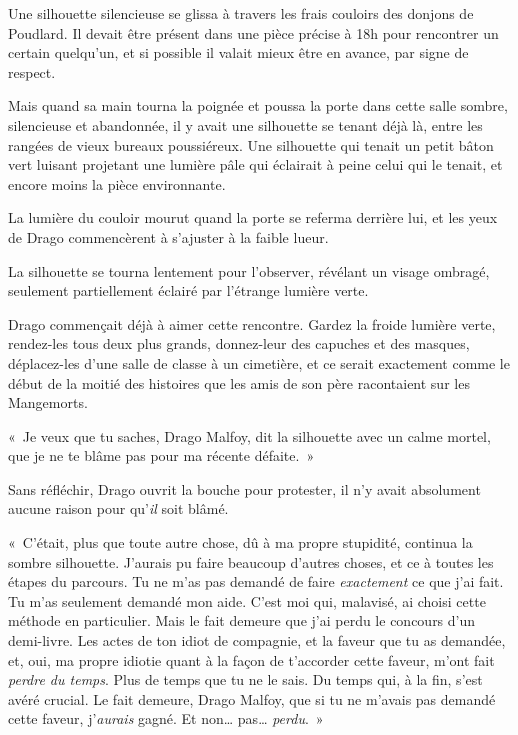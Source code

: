 \later

Une silhouette silencieuse se glissa à travers les frais couloirs des donjons de Poudlard.
Il devait être présent dans une pièce précise à 18h pour rencontrer un certain quelqu'un, et si possible il valait mieux être en avance, par signe de respect.

Mais quand sa main tourna la poignée et poussa la porte dans cette salle sombre, silencieuse et abandonnée, il y avait une silhouette se tenant déjà là, entre les rangées de vieux bureaux poussiéreux.
Une silhouette qui tenait un petit bâton vert luisant projetant une lumière pâle qui éclairait à peine celui qui le tenait, et encore moins la pièce environnante.

La lumière du couloir mourut quand la porte se referma derrière lui, et les yeux de Drago commencèrent à s'ajuster à la faible lueur.

La silhouette se tourna lentement pour l'observer, révélant un visage ombragé, seulement partiellement éclairé par l'étrange lumière verte.

Drago commençait déjà à aimer cette rencontre.
Gardez la froide lumière verte, rendez-les tous deux plus grands, donnez-leur des capuches et des masques, déplacez-les d'une salle de classe à un cimetière, et ce serait exactement comme le début de la moitié des histoires que les amis de son père racontaient sur les Mangemorts.

«~Je veux que tu saches, Drago Malfoy, dit la silhouette avec un calme mortel, que je ne te blâme pas pour ma récente défaite.~»

Sans réfléchir, Drago ouvrit la bouche pour protester, il n'y avait absolument aucune raison pour qu'\emph{il} soit blâmé.

«~C'était, plus que toute autre chose, dû à ma propre stupidité, continua la sombre silhouette.
J'aurais pu faire beaucoup d'autres choses, et ce à toutes les étapes du parcours.
Tu ne m'as pas demandé de faire \emph{exactement} ce que j'ai fait.
Tu m'as seulement demandé mon aide.
C'est moi qui, malavisé, ai choisi cette méthode en particulier.
Mais le fait demeure que j'ai perdu le concours d'un demi-livre.
Les actes de ton idiot de compagnie, et la faveur que tu as demandée, et, oui, ma propre idiotie quant à la façon de t'accorder cette faveur, m'ont fait \emph{perdre du temps}.
Plus de temps que tu ne le sais.
Du temps qui, à la fin, s'est avéré crucial.
Le fait demeure, Drago Malfoy, que si tu ne m'avais pas demandé cette faveur, j'\emph{aurais} gagné.
Et non… pas…
\emph{perdu}.~»

